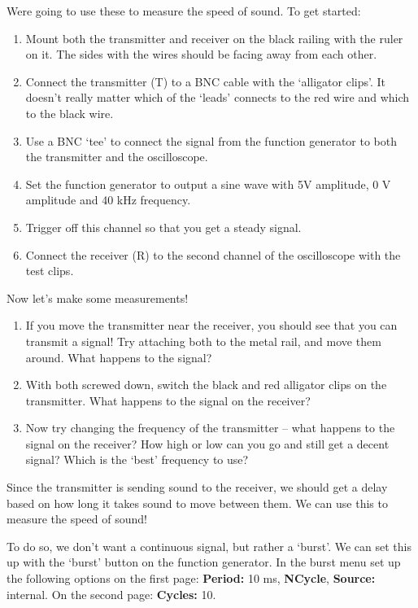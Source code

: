 \documentclass[12pt, letterpaper]{article}
\begin{document}
Were going to use these to measure the speed of sound.
To get started:
\begin{enumerate}
	\item Mount both the transmitter and receiver on the black railing with the ruler on it.  The sides with the wires should be facing away from each other.
	\item Connect the transmitter (T) to a BNC cable with the `alligator clips'.  It doesn't really matter which of the `leads' connects to the red wire and which to the black wire.
	\item Use a BNC `tee' to connect the signal from the function generator to both the transmitter and the oscilloscope.
	\item Set the function generator to output a sine wave with 5V amplitude, 0 V amplitude and 40 kHz frequency.
	\item Trigger off this channel so that you get a steady signal.
	\item Connect the receiver (R) to the second channel of the oscilloscope with the test clips.
\end{enumerate}

Now let's make some measurements!

\begin{enumerate}
	\item If you move the transmitter near the receiver, you should see that you can transmit a signal!  Try attaching both to the metal rail, and move them around.  What happens to the signal?

	\answergrid{3cm}
	\item With both screwed down, switch the black and red alligator clips on the transmitter.  What happens to the signal on the receiver? 

	\answergrid{3cm}
	\item Now try changing the frequency of the transmitter -- what happens to the signal on the receiver?  How high or low can you go and still get a decent signal?  Which is the `best' frequency to use?
	
	\answergrid{3cm}
\end{enumerate}

Since the transmitter is sending sound to the receiver, we should get a delay based on how long it takes sound to move between them.
We can use this to measure the speed of sound!

To do so, we don't want a continuous signal, but rather a `burst'.
We can set this up with the `burst' button on the function generator.  
In the burst menu set up the following options on the first page: \textbf{Period:} 10 ms, \textbf{NCycle}, \textbf{Source:} internal.
On the second page: \textbf{Cycles:} 10.
\end{document}
